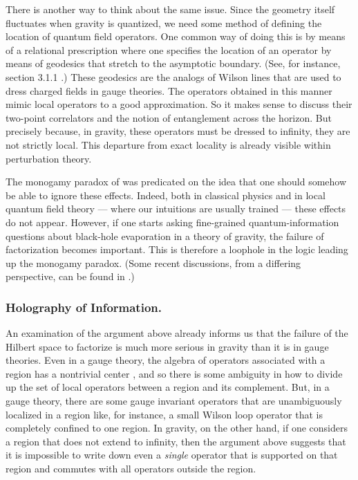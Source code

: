 \documentclass[12pt]{article}
\begin{document}
There is another way to think about the same issue. Since the geometry itself fluctuates when gravity is quantized, we need some method of defining the location of quantum field operators. One common way of doing this is by means of a relational prescription where one specifies the location of an operator by means of geodesics that stretch to the asymptotic boundary. (See, for instance, section 3.1.1 \cite{Papadodimas:2015jra}.) These geodesics are the analogs of Wilson lines that are used to dress charged fields in gauge theories.  The operators obtained in this manner mimic local operators to a good approximation. So it makes sense to discuss their two-point correlators and the notion of entanglement across the horizon. But precisely because, in gravity, these operators must be dressed to infinity, they are not strictly local. This departure from exact locality is already visible within perturbation theory.

The monogamy paradox of \cite{Mathur:2009hf,Almheiri:2012rt} was predicated on the idea that one
should somehow be able to ignore these effects. Indeed, both in classical physics and in local quantum field
theory  --- where our intuitions are usually trained --- these effects do not appear. However, if one
starts asking fine-grained quantum-information questions about black-hole evaporation in a theory of gravity, the failure of factorization becomes important. This is therefore a loophole in the logic leading up the monogamy paradox. (Some recent discussions, from a differing perspective, can be found in \cite{Karlsson:2020uga,Karlsson:2019vlf}.)


\subsubsection*{Holography of Information.}
An examination of the argument above already informs us that the failure of the Hilbert space to factorize is
 much more serious in gravity than it is in gauge theories. Even in a gauge theory, the algebra of operators
associated with a region has a nontrivial center \cite{Casini:2013rba,Casini:2014aia,Soni:2015yga,Ghosh:2015iwa}, and so there is some ambiguity in how to divide up the set of local operators between a region and its complement. But, in a gauge theory, there are some gauge invariant operators that are  unambiguously localized in a region like, for instance, a small Wilson loop operator that is completely confined
to one region. In gravity, on the other hand, if one considers a region that does not extend to infinity,
then the argument above suggests that it is impossible to write down even a {\em single} operator that is
supported on that region and commutes with all operators outside the region.
\end{document}
